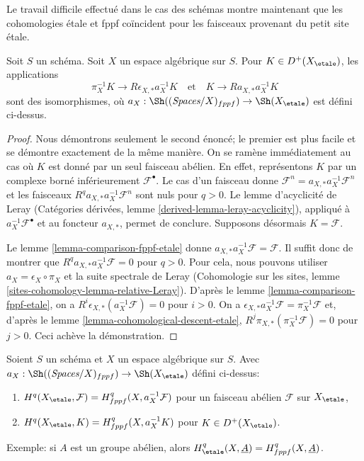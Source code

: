 \noindent
Le travail difficile effectué dans le cas des schémas montre maintenant que
les cohomologies étale et fppf coïncident pour les faisceaux provenant du
petit site étale.

\begin{lemma}
\label{lemma-cohomological-descent-etale-fppf}
Soit $S$ un schéma. Soit $X$ un espace algébrique sur $S$.
Pour $K \in D^+(X_\etale)$, les applications
$$
\pi_X^{-1}K \longrightarrow R\epsilon_{X, *}a_X^{-1}K
\quad\text{et}\quad
K \longrightarrow Ra_{X, *}a_X^{-1}K
$$
sont des isomorphismes, où
$a_X : \Sh((\textit{Spaces}/X)_{fppf}) \to \Sh(X_\etale)$ est défini ci-dessus.
\end{lemma}

\begin{proof}
Nous démontrons seulement le second énoncé; le premier est plus facile et se
démontre exactement de la même manière. On se ramène immédiatement au cas où
$K$ est donné par un seul faisceau abélien. En effet, représentons $K$ par un
complexe borné inférieurement $\mathcal{F}^\bullet$. Le cas d'un faisceau donne
$\mathcal{F}^n = a_{X, *} a_X^{-1} \mathcal{F}^n$
et les faisceaux $R^qa_{X, *}a_X^{-1}\mathcal{F}^n$ sont nuls pour $q > 0$.
Le lemme d'acyclicité de Leray (Catégories dérivées, lemme
\ref{derived-lemma-leray-acyclicity}), appliqué à
$a_X^{-1}\mathcal{F}^\bullet$ et au foncteur $a_{X, *}$, permet de conclure.
Supposons désormais $K = \mathcal{F}$.

\medskip\noindent
Le lemme \ref{lemma-comparison-fppf-etale} donne
$a_{X, *}a_X^{-1}\mathcal{F} = \mathcal{F}$. Il suffit donc de montrer que
$R^qa_{X, *}a_X^{-1}\mathcal{F} = 0$ pour $q > 0$.
Pour cela, nous pouvons utiliser $a_X = \epsilon_X \circ \pi_X$ et la suite
spectrale de Leray (Cohomologie sur les sites, lemme
\ref{sites-cohomology-lemma-relative-Leray}).
D'après le lemme \ref{lemma-comparison-fppf-etale}, on a
$R^i\epsilon_{X, *}(a_X^{-1}\mathcal{F}) = 0$ pour $i > 0$.
On a
$\epsilon_{X, *}a_X^{-1}\mathcal{F} = \pi_X^{-1}\mathcal{F}$
et, d'après le lemme \ref{lemma-cohomological-descent-etale},
$R^j\pi_{X, *}(\pi_X^{-1}\mathcal{F}) = 0$ pour $j > 0$.
Ceci achève la démonstration.
\end{proof}

\begin{lemma}
\label{lemma-compare-cohomology-etale-fppf}
Soient $S$ un schéma et $X$ un espace algébrique sur $S$.
Avec $a_X : \Sh((\textit{Spaces}/X)_{fppf}) \to \Sh(X_\etale)$
défini ci-dessus:
\begin{enumerate}
\item $H^q(X_\etale, \mathcal{F}) = H^q_{fppf}(X, a_X^{-1}\mathcal{F})$
pour un faisceau abélien $\mathcal{F}$ sur $X_\etale$,
\item $H^q(X_\etale, K) = H^q_{fppf}(X, a_X^{-1}K)$ pour $K \in D^+(X_\etale)$.
\end{enumerate}
Exemple: si $A$ est un groupe abélien, alors
$H^q_\etale(X, \underline{A}) = H^q_{fppf}(X, \underline{A})$.
\end{lemma}


